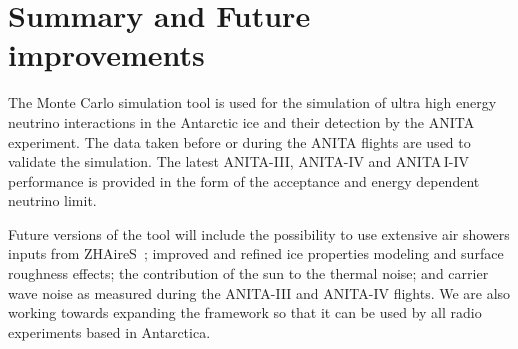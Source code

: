 





\section{Summary and Future improvements}
\label{sec:future}
The \icemc Monte Carlo simulation tool is used for the
simulation of ultra high energy neutrino interactions in the Antarctic
ice and their detection by the ANITA experiment.
The data taken before or during the ANITA flights are used to validate the
simulation.
The latest ANITA-III, ANITA-IV and ANITA\,I-IV performance is provided in the form of the
acceptance and energy dependent neutrino limit.
 
Future versions of the tool will include the possibility to use extensive air showers inputs from ZHAireS~\cite{alvarez2012monte}; improved and refined ice properties modeling and surface roughness effects; the contribution of the sun to the thermal noise; and carrier wave noise as measured during the ANITA-III and ANITA-IV flights.
We are also working towards expanding the framework so that it can be used by all radio experiments based in Antarctica.
